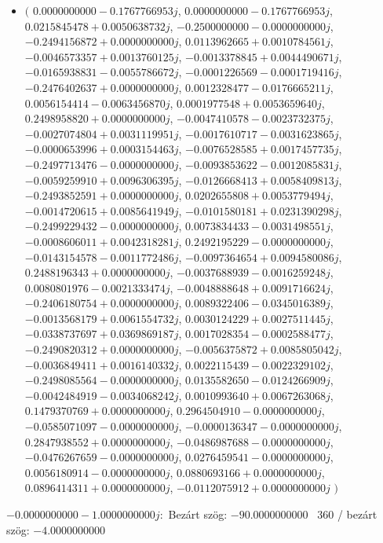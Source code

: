\documentclass[14pt,a4paper]{article}
\begin{document}
\begin{itemize}
\item
$\big($
$0.0000000000-0.1767766953j$, $0.0000000000-0.1767766953j$, $0.0215845478+0.0050638732j$, $-0.2500000000-0.0000000000j$, $-0.2494156872+0.0000000000j$, $0.0113962665+0.0010784561j$, $-0.0046573357+0.0013760125j$, $-0.0013378845+0.0044490671j$, $-0.0165938831-0.0055786672j$, $-0.0001226569-0.0001719416j$, $-0.2476402637+0.0000000000j$, $0.0012328477-0.0176665211j$, $0.0056154414-0.0063456870j$, $0.0001977548+0.0053659640j$, $0.2498958820+0.0000000000j$, $-0.0047410578-0.0023732375j$, $-0.0027074804+0.0031119951j$, $-0.0017610717-0.0031623865j$, $-0.0000653996+0.0003154463j$, $-0.0076528585+0.0017457735j$, $-0.2497713476-0.0000000000j$, $-0.0093853622-0.0012085831j$, $-0.0059259910+0.0096306395j$, $-0.0126668413+0.0058409813j$, $-0.2493852591+0.0000000000j$, $0.0202655808+0.0053779494j$, $-0.0014720615+0.0085641949j$, $-0.0101580181+0.0231390298j$, $-0.2499229432-0.0000000000j$, $0.0073834433-0.0031498551j$, $-0.0008606011+0.0042318281j$, $0.2492195229-0.0000000000j$, $-0.0143154578-0.0011772486j$, $-0.0097364654+0.0094580086j$, $0.2488196343+0.0000000000j$, $-0.0037688939-0.0016259248j$, $0.0080801976-0.0021333474j$, $-0.0048888648+0.0091716624j$, $-0.2406180754+0.0000000000j$, $0.0089322406-0.0345016389j$, $-0.0013568179+0.0061554732j$, $0.0030124229+0.0027511445j$, $-0.0338737697+0.0369869187j$, $0.0017028354-0.0002588477j$, $-0.2490820312+0.0000000000j$, $-0.0056375872+0.0085805042j$, $-0.0036849411+0.0016140332j$, $0.0022115439-0.0022329102j$, $-0.2498085564-0.0000000000j$, $0.0135582650-0.0124266909j$, $-0.0042484919-0.0034068242j$, $0.0010993640+0.0067263068j$, $0.1479370769+0.0000000000j$, $0.2964504910-0.0000000000j$, $-0.0585071097-0.0000000000j$, $-0.0000136347-0.0000000000j$, $0.2847938552+0.0000000000j$, $-0.0486987688-0.0000000000j$, $-0.0476267659-0.0000000000j$, $0.0276459541-0.0000000000j$, $0.0056180914-0.0000000000j$, $0.0880693166+0.0000000000j$, $0.0896414311+0.0000000000j$, $-0.0112075912+0.0000000000j$
$\big)$
\end{itemize}
$-0.0000000000-1.0000000000j$:\
Bezárt szög: $-90.0000000000$ \
360 / bezárt szög: $-4.0000000000$\
\end{document}
